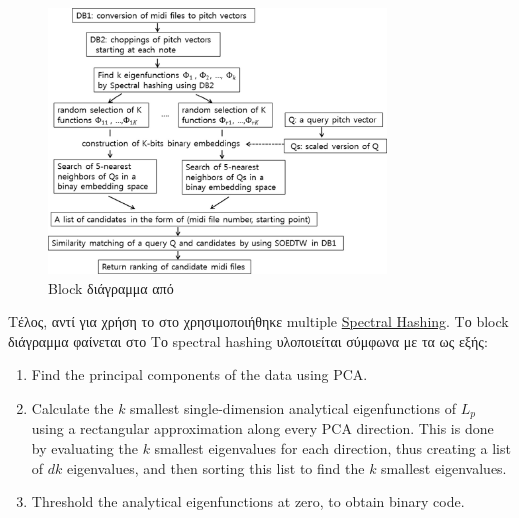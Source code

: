 \begin{figure}
	\centering
	\includegraphics[width=0.8\textwidth]{park2015query}
	\caption{Block διάγραμμα από \protect\cite{park2015query}}
	\label{fig:park2015query}
\end{figure}

Τέλος, αντί για χρήση \lsh{} το \citeyear{park2015query} στο \cite{park2015query} χρησιμοποιήθηκε multiple \href{https://en.wikipedia.org/wiki/Spectral_Hash}{Spectral Hashing}.
Το block διάγραμμα φαίνεται στο 
Το spectral hashing υλοποιείται σύμφωνα με τα \cite{weiss2009spectral,weiss2009spectral-blog} ως εξής:
\begin{enumerate}
\item Find the principal components of the data using PCA.
\item Calculate the $k$ smallest single-dimension analytical eigenfunctions of $L_p$ using a rectangular approximation along every PCA direction.
This is done by evaluating the $k$ smallest eigenvalues for each direction, thus creating a list of $dk$ eigenvalues, and then sorting this list to find the $k$ smallest eigenvalues.
\item Threshold the analytical eigenfunctions at zero, to obtain binary code.
\end{enumerate}

\undef{\ls}
\undef{\lsh}
